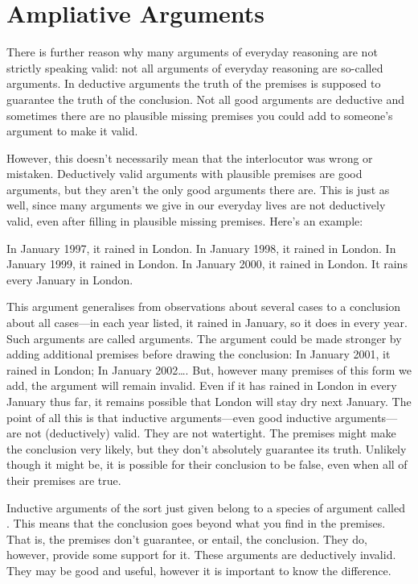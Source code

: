 \section{Ampliative Arguments}
There is further reason why many arguments of everyday reasoning are not strictly speaking valid: not all arguments of everyday reasoning are so-called  arguments. In deductive arguments the truth of the premises is supposed to guarantee the truth of the conclusion. Not all good arguments are deductive and sometimes there are no plausible missing premises you could add to someone's argument to make it valid.

However, this doesn't necessarily mean that the interlocutor was wrong or mistaken.
Deductively valid arguments with plausible premises are good arguments, but they aren't the only good arguments there are. This is just as well, since many arguments we give in our everyday lives are not deductively valid, even after filling in plausible missing premises. Here's an example:
	\begin{earg}
		\prem In January 1997, it rained in London.
		\prem In January 1998, it rained in London.
		\prem In January 1999, it rained in London.
		\prem In January 2000, it rained in London.
	\conc It rains every January in London.
\end{earg}

This argument generalises from observations about several cases to a conclusion about all cases---in each year listed, it rained in January, so it does in every year. Such arguments are called  arguments. The argument could be made stronger by adding additional premises before drawing the conclusion: In January 2001, it rained in London; In January 2002\ldots. But, however many premises of this form we add, the argument will remain invalid. Even if it has rained in London in every January thus far, it remains possible that London will stay dry next January. The point of all this is that inductive arguments—even good inductive arguments—are not (deductively) valid. They are not watertight. The premises might make the conclusion very likely, but they don't absolutely guarantee its truth. Unlikely though it might be, it is possible for their conclusion to be false, even when all of their premises are true.

Inductive arguments of the sort just given belong to a species of argument called . This means that the conclusion goes beyond what you find in the premises. That is, the premises don't guarantee, or entail, the conclusion. They do, however, provide some support for it. These arguments are deductively invalid. They may be good and useful, however it is important to know the difference.

